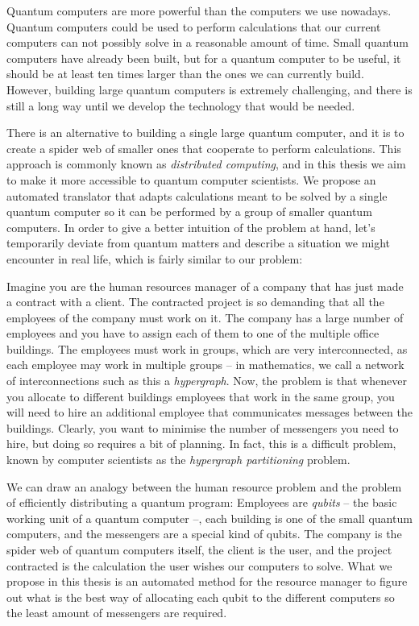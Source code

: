 Quantum computers are more powerful than the computers we use nowadays. Quantum computers could be used to perform calculations that our current computers can not possibly solve in a reasonable amount of time. Small quantum computers have already been built, but for a quantum computer to be useful, it should be at least ten times larger than the ones we can currently build. However, building large quantum computers is extremely challenging, and there is still a long way until we develop the technology that would be needed.

There is an alternative to building a single large quantum computer, and it is to create a spider web of smaller ones that cooperate to perform calculations. This approach is commonly known as \textit{distributed computing}, and in this thesis we aim to make it more accessible to quantum computer scientists. We propose an automated translator that adapts calculations meant to be solved by a single quantum computer so it can be performed by a group of smaller quantum computers. In order to give a better intuition of the problem at hand, let's temporarily deviate from quantum matters and describe a situation we might encounter in real life, which is fairly similar to our problem: 

Imagine you are the human resources manager of a company that has just made a contract with a client. The contracted project is so demanding that all the employees of the company must work on it. The company has a large number of employees and you have to assign each of them to one of the multiple office buildings. The employees must work in groups, which are very interconnected, as each employee may work in multiple groups -- in mathematics, we call a network of interconnections such as this a \textit{hypergraph}. Now, the problem is that whenever you allocate to different buildings employees that work in the same group, you will need to hire an additional employee that communicates messages between the buildings. Clearly, you want to minimise the number of messengers you need to hire, but doing so requires a bit of planning. In fact, this is a difficult problem, known by computer scientists as the \textit{hypergraph partitioning} problem.

We can draw an analogy between the human resource problem and the problem of efficiently distributing a quantum program: Employees are \textit{qubits} -- the basic working unit of a quantum computer --, each building is one of the small quantum computers, and the messengers are a special kind of qubits. The company is the spider web of quantum computers itself, the client is the user, and the project contracted is the calculation the user wishes our computers to solve. What we propose in this thesis is an automated method for the resource manager to figure out what is the best way of allocating each qubit to the different computers so the least amount of messengers are required.

